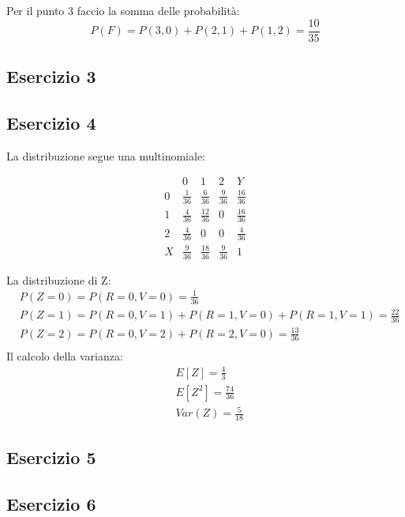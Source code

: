 \documentclass[12pt]{article}
\begin{document}
Per il punto 3 faccio la somma delle probabilità:
\[
P(F) = P(3,0) + P(2,1) + P(1,2) = \frac{10}{35}    
\]
\subsection*{Esercizio 3}

\subsection*{Esercizio 4}

La distribuzione segue una multinomiale:

\begin{equation*}
    \renewcommand{\arraystretch}{1.5}
    \begin{array}{c|ccc|c}
          & 0 & 1 & 2 & Y\\
    \hline
    0 & \frac{1}{36} & \frac{6}{36} & \frac{9}{36} & \frac{16}{36}\\
    1 & \frac{4}{36} & \frac{12}{36} & 0 & \frac{16}{36} \\
    2 & \frac{4}{36} & 0 & 0  & \frac{4}{36}\\ 
    \hline
    X & \frac{9}{36} & \frac{18}{36} & \frac{9}{36} & 1 
    \end{array}
\end{equation*}

La distribuzione di Z:
\begin{align*}
    &P(Z=0) = P(R=0,V=0) = \frac{1}{36} \\
    &P(Z=1) = P(R=0,V=1) + P(R=1,V=0) + P(R=1,V=1) = \frac{22}{36} \\
    &P(Z=2) = P(R=0,V=2) + P(R=2,V=0)  = \frac{13}{36} \\
\end{align*}
Il calcolo della varianza:
\begin{align*}
    &E[Z] = \frac{4}{3} \\
    &E[Z^2] = \frac{74}{36} \\
    &Var(Z) = \frac{5}{18}    
\end{align*}
    
\subsection*{Esercizio 5}

\subsection*{Esercizio 6}
\end{document}
